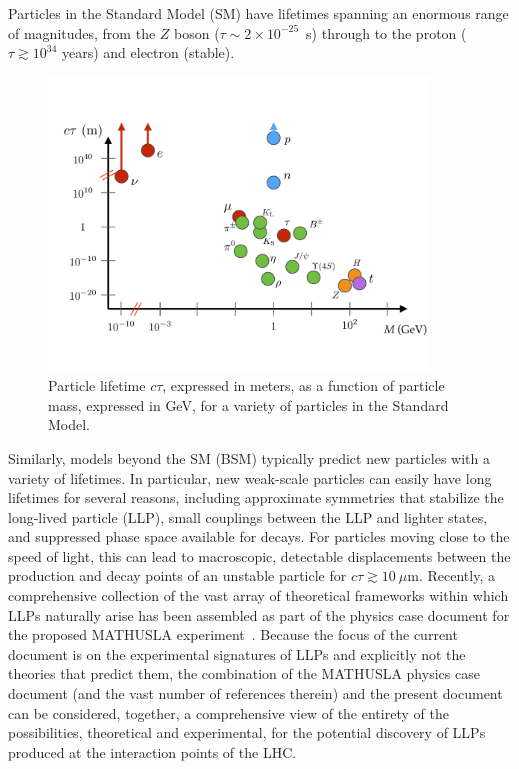 
\noindent Particles in the Standard Model (SM) have lifetimes spanning an enormous range of magnitudes, from the $Z$ boson ($\tau\sim2\times10^{-25}$~s) through to the proton ($\tau\gtrsim10^{34}$ years) and electron (stable).

\begin{figure}[htb]
\centering
\includegraphics[width=0.9\textwidth]{plots/lifetime_plot.pdf}
\caption{Particle lifetime $c\tau$, expressed in meters, as a function of particle mass, expressed in GeV, for a variety of particles in the Standard Model.}
 \label{fig:SMLifetimes}
\end{figure}

Similarly, models beyond the SM (BSM) typically predict new particles with a variety of lifetimes.
In particular, new weak-scale particles can easily have long lifetimes for several reasons, including approximate symmetries that stabilize the long-lived particle (LLP), small couplings between the LLP and lighter states, and suppressed phase space available for decays.
For particles moving close to the speed of light, this can lead to macroscopic, detectable displacements between the production and decay points of an unstable particle for $c\tau\gtrsim 10~\mu\mathrm{m}$. Recently, a comprehensive collection of the vast array of theoretical frameworks within which LLPs naturally arise has been assembled as part of the physics case document for the proposed MATHUSLA experiment~\cite{Curtin:2018mvb}. Because the focus of the current document is on the experimental signatures of LLPs and explicitly not the theories that predict them, the combination of the MATHUSLA physics case document (and the vast number of references therein) and the present document can be considered, together, a comprehensive view of the entirety of the possibilities, theoretical and experimental, for the potential discovery of LLPs produced at the interaction points of the LHC.


